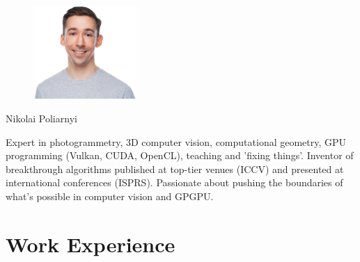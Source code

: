 \documentclass[11pt,oneside]{article}
\begin{document}
\begin{figure}
  \vspace{-80pt}
  \includegraphics[width=0.35\textwidth]{photo2025.png}
  \vspace{-10pt}
\end{figure}

\begin{center}
        {\huge Nikolai Poliarnyi}
\end{center}

Expert in photogrammetry, 3D computer vision, computational geometry, GPU programming (Vulkan, CUDA, OpenCL), teaching and 'fixing things'. Inventor of breakthrough algorithms published at top-tier venues (ICCV) and presented at international conferences (ISPRS). Passionate about pushing the boundaries of what's possible in computer vision and GPGPU.

\vspace{-9pt}
\section*{\textbf{Work Experience}}
\vspace{-9pt}
\end{document}
